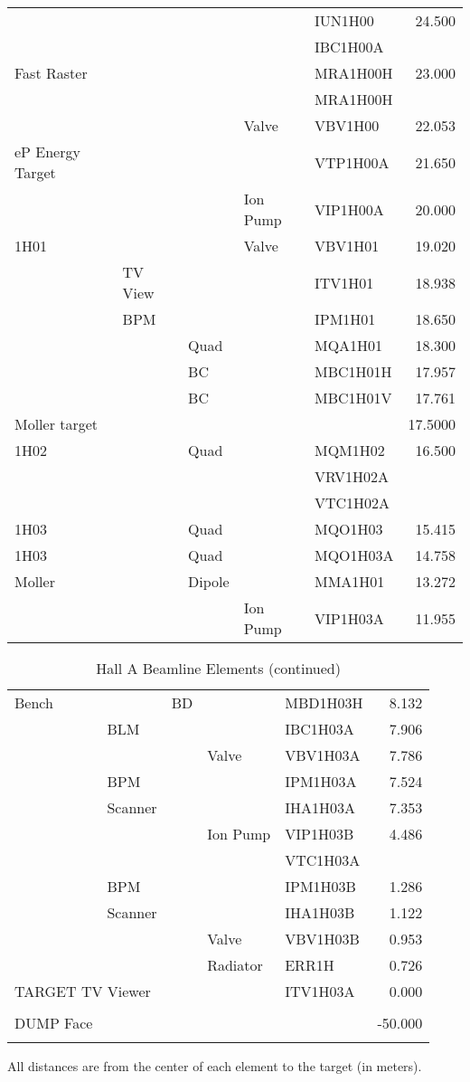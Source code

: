\begin{table}[hp]
\begin{tabular}{lllllr}
&&&& IUN1H00 & 24.500 \\
&&&& IBC1H00A & \\
Fast Raster &&&& MRA1H00H & 23.000 \\ 
&&&& MRA1H00H & \\ 
&&& Valve & VBV1H00 & 22.053 \\
eP Energy Target &&&& VTP1H00A & 21.650 \\
&&& Ion Pump & VIP1H00A & 20.000 \\
1H01 &&& Valve & VBV1H01 & 19.020 \\
& TV View &&& ITV1H01 & 18.938 \\
& BPM &&& IPM1H01 & 18.650 \\
&& Quad && MQA1H01 & 18.300 \\
&& BC && MBC1H01H & 17.957 \\
&& BC && MBC1H01V & 17.761 \\ \hline
Moller target &&&&&17.5000 \\
1H02 && Quad && MQM1H02 & 16.500 \\
&&&& VRV1H02A \\
&&&& VTC1H02A \\
1H03 && Quad && MQO1H03 & 15.415 \\
1H03 && Quad && MQO1H03A & 14.758 \\
Moller && Dipole && MMA1H01 & 13.272 \\
&&& Ion Pump & VIP1H03A & 11.955 
\end{tabular}
\end{table}

\begin{table}[hp]
\caption[Beamline: Hall A Beamline Elements]{Hall A Beamline Elements (continued)}
\label{beam_tab1c}
\begin{tabular}{lllllr} \hline
Bench && BD && MBD1H03H & 8.132 \\
& BLM &&& IBC1H03A & 7.906 \\
&&& Valve & VBV1H03A & 7.786 \\
& BPM &&& IPM1H03A & 7.524 \\
& Scanner &&& IHA1H03A & 7.353 \\
&&& Ion Pump & VIP1H03B & 4.486 \\
&&&& VTC1H03A & \\
& BPM &&& IPM1H03B & 1.286 \\
& Scanner &&& IHA1H03B & 1.122 \\
&&& Valve & VBV1H03B & 0.953 \\ 
&&& Radiator & ERR1H & 0.726 \\ \hline
\multicolumn{4}{l}{TARGET TV Viewer} & ITV1H03A & 0.000 \\
&&&&& \\
DUMP Face &&&&& -50.000 \\
&&&&& \\ \hline
\end{tabular}

All distances are from the center of each element to the target (in 
meters).

\end{table}

